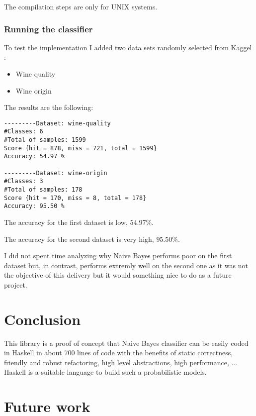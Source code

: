 \documentclass[12pt, a4paper]{article}
\begin{document}
The compilation steps are only for UNIX systems.

\subsubsection{Running the classifier} \label{compiling}

To test the implementation I added two data sets randomly selected from Kaggel \cite{kaggel}:

\begin{itemize}
  \item Wine quality \cite{wine-quality}
  \item Wine origin \cite{wine-origin}
\end{itemize}

The results are the following:

\begin{verbatim}
---------Dataset: wine-quality
#Classes: 6
#Total of samples: 1599
Score {hit = 878, miss = 721, total = 1599}
Accuracy: 54.97 %

---------Dataset: wine-origin
#Classes: 3
#Total of samples: 178
Score {hit = 170, miss = 8, total = 178}
Accuracy: 95.50 %
\end{verbatim}

The accuracy for the first dataset is low, $54.97\%$.

The accuracy for the second dataset is very high, $95.50\%$.

I did not spent time analyzing why Naive Bayes performs poor on the first dataset but, in contrast, performs extremly well on the second one as it was not the objective
of this delivery but it would something nice to do as a future project.

\section{Conclusion} \label{conclusion}

This library is a proof of concept that Naive Bayes classifier can be easily coded in Haskell in about 700 lines of code with the benefits of static correctness, friendly and robust refactoring, high level abstractions, high performance, ... Haskell is a suitable language to build such a probabilistic models.

\section{Future work} \label{future-work}
\end{document}
